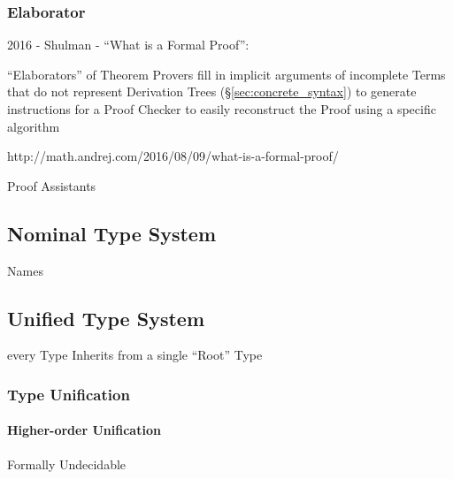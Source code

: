 \subsubsection{Elaborator}\label{sec:elaborator}

2016 - Shulman - ``What is a Formal Proof'': %

``Elaborators'' of Theorem Provers fill in implicit arguments of
incomplete Terms that do not represent Derivation Trees
(\S\ref{sec:concrete_syntax}) to generate instructions for a Proof
Checker to easily reconstruct the Proof using a specific algorithm

http://math.andrej.com/2016/08/09/what-is-a-formal-proof/ %

Proof Assistants %



\subsection{Nominal Type System}\label{sec:nominal_type_system}

Names



\subsection{Unified Type System}\label{sec:unified_type_system}

every Type Inherits from a single ``Root'' Type



\subsubsection{Type Unification}\label{sec:type_unification}




\paragraph{Higher-order Unification}
\label{sec:higherorder_unification}\hfill

Formally Undecidable



